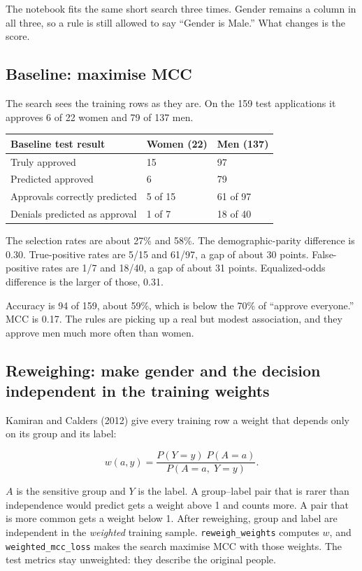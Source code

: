 \documentclass[11pt]{article}
\newcommand{\fn}[1]{\texttt{\small #1}}
\newcommand{\pct}[1]{\mbox{#1\%}}
\begin{document}
The notebook fits the same short search three times. Gender remains a column in all three, so a rule is still allowed to say ``Gender is Male.'' What changes is the score.

\subsection{Baseline: maximise MCC}

The search sees the training rows as they are. On the 159 test applications it approves 6 of 22 women and 79 of 137 men.

\begin{table}[H]
\centering
\small
\begin{tabularx}{\textwidth}{@{}l Y Y@{}}
\toprule
Baseline test result & Women (22) & Men (137) \\
\midrule
Truly approved & 15 & 97 \\
Predicted approved & 6 & 79 \\
Approvals correctly predicted & 5 of 15 & 61 of 97 \\
Denials predicted as approval & 1 of 7 & 18 of 40 \\
\bottomrule
\end{tabularx}
\end{table}

The selection rates are about \pct{27} and \pct{58}. The demographic-parity difference is 0.30. True-positive rates are 5/15 and 61/97, a gap of about 30 points. False-positive rates are 1/7 and 18/40, a gap of about 31 points. Equalized-odds difference is the larger of those, 0.31.

Accuracy is 94 of 159, about \pct{59}, which is below the \pct{70} of ``approve everyone.'' MCC is 0.17. The rules are picking up a real but modest association, and they approve men much more often than women.

\subsection{Reweighing: make gender and the decision independent in the training weights}

Kamiran and Calders (2012) give every training row a weight that depends only on its group and its label:

\[
w(a, y)
=
\frac{P(Y = y)\; P(A = a)}{P(A = a,\; Y = y)}.
\]

\(A\) is the sensitive group and \(Y\) is the label. A group--label pair that is rarer than independence would predict gets a weight above 1 and counts more. A pair that is more common gets a weight below 1. After reweighing, group and label are independent in the \emph{weighted} training sample. \fn{reweigh\_weights} computes \(w\), and \fn{weighted\_mcc\_loss} makes the search maximise MCC with those weights. The test metrics stay unweighted: they describe the original people.
\end{document}

